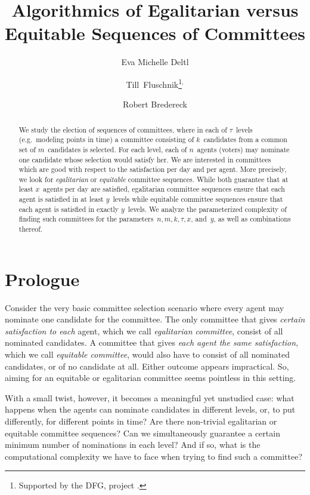 \documentclass[10pt,a4paper,twocolumn]{article}
\title{Algorithmics of Egalitarian versus Equitable Sequences of Committees}
\author[1]{Eva Michelle Deltl}
\author[1,2]{Till~Fluschnik\thanks{Supported by the DFG, project \AFFA.}$^,$}
\author[2]{Robert Bredereck}
\affil[1]{\small
  Technische Universität Berlin, Faculty~IV, Algorithmics and Computational Complexity, Germany\\
  \texttt{e.deltl@campus.tu-berlin.de}
}
\affil[2]{\small
  Institut für Informatik, TU Clausthal, Germany\\
  \texttt{robert.bredereck@tu-clausthal.de,till.fluschnik@tu-clausthal.de}
}
\date{}
\theoremstyle{plain}
\theoremstyle{definition}
\theoremstyle{remark}
\begin{document}
\maketitle

%

\begin{abstract}
We study the election of sequences of committees, where in each of $\tau$~levels (e.g.\ modeling points in time)
a committee consisting of $k$~candidates from a common set of $m$~candidates is selected.
For each level, each of $n$~agents (voters) may nominate one candidate whose selection would satisfy her.
We are interested in committees which are good with respect to the satisfaction per day and per agent.
More precisely, we look for \emph{egalitarian} or \emph{equitable} committee sequences.
While both guarantee that at least $x$~agents per day are satisfied,
egalitarian committee sequences ensure that each agent is satisfied in at least $y$~levels
while equitable committee sequences ensure that each agent is satisfied in exactly $y$~levels.
We analyze the parameterized complexity of finding such committees for the
parameters~$n,m,k,\tau,x$, and~$y$,
as well as combinations thereof.
\end{abstract}

%

%
%
%
\section{Prologue}
Consider the very basic committee selection scenario where every agent
may nominate one candidate for the committee.
The only committee that gives \emph{certain satisfaction to each} agent,
which we call \emph{egalitarian committee},
consist of all nominated candidates.
A committee that gives \emph{each agent the same satisfaction},
which we call \emph{equitable committee},
would also have to consist of all nominated candidates,
or of no candidate at all.
Either outcome appears impractical.
So,
aiming for an equitable or egalitarian committee seems pointless in this setting.

With a small twist, however, it becomes a meaningful yet unstudied case:
%
what happens when the agents can nominate candidates in different levels,
or, 
to put differently,
for different points in time?
%
%
Are there non-trivial egalitarian or equitable committee sequences?
Can we simultaneously guarantee a certain minimum number of nominations in each level?
%
And if so,
what is the computational complexity we have to face when trying to find such a committee?
%
\end{document}
